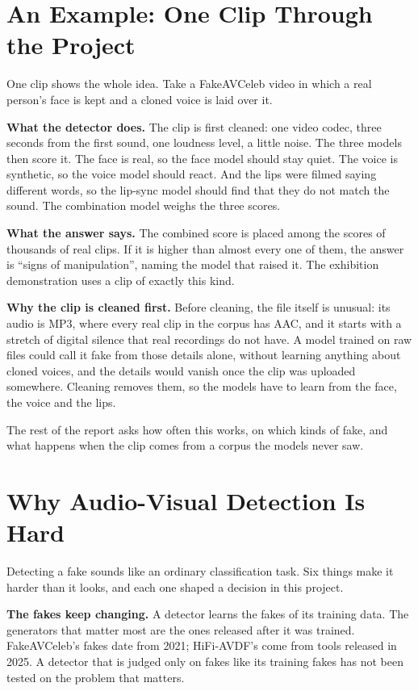 \section{An Example: One Clip Through the Project}

One clip shows the whole idea. Take a FakeAVCeleb video in which a real
person's face is kept and a cloned voice is laid over it.

\textbf{What the detector does.} The clip is first cleaned: one video codec,
three seconds from the first sound, one loudness level, a little noise. The
three models then score it. The face is real, so the face model should stay
quiet. The voice is synthetic, so the voice model should react. And the lips
were filmed saying different words, so the lip-sync model should find that
they do not match the sound. The combination model weighs the three scores.

\textbf{What the answer says.} The combined score is placed among the scores
of thousands of real clips. If it is higher than almost every one of them, the
answer is ``signs of manipulation'', naming the model that raised it. The
exhibition demonstration uses a clip of exactly this kind.

\textbf{Why the clip is cleaned first.} Before cleaning, the file itself is
unusual: its audio is MP3, where every real clip in the corpus has AAC, and it
starts with a stretch of digital silence that real recordings do not have. A
model trained on raw files could call it fake from those details alone, without
learning anything about cloned voices, and the details would vanish once the
clip was uploaded somewhere. Cleaning removes them, so the models have to learn
from the face, the voice and the lips.

The rest of the report asks how often this works, on which kinds of fake, and
what happens when the clip comes from a corpus the models never saw.

\section{Why Audio-Visual Detection Is Hard}
\label{sec:challenges}

Detecting a fake sounds like an ordinary classification task. Six things make
it harder than it looks, and each one shaped a decision in this project.

\textbf{The fakes keep changing.} A detector learns the fakes of its training
data. The generators that matter most are the ones released after it was
trained. FakeAVCeleb's fakes date from 2021; HiFi-AVDF's come from tools
released in 2025. A detector that is judged only on fakes like its training
fakes has not been tested on the problem that matters.

